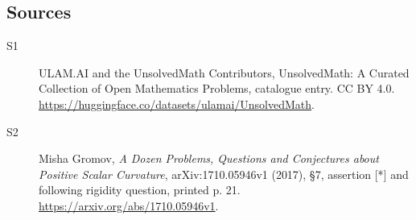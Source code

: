 \documentclass[11pt]{article}
\begin{document}
\subsection{Sources}
\begin{description}
\item[\hypertarget{source:statement:1}{S1}] ULAM.AI and the UnsolvedMath Contributors, UnsolvedMath: A Curated Collection of Open Mathematics Problems, catalogue entry. CC BY 4.0. \url{https://huggingface.co/datasets/ulamai/UnsolvedMath}.
\item[\hypertarget{source:statement:2}{S2}] Misha Gromov, \emph{A Dozen Problems, Questions and Conjectures about Positive Scalar Curvature}, arXiv:1710.05946v1 (2017), \S7, assertion [*] and following rigidity question, printed p. 21. \url{https://arxiv.org/abs/1710.05946v1}.
\end{description}
\label{end:statement}
\end{document}
